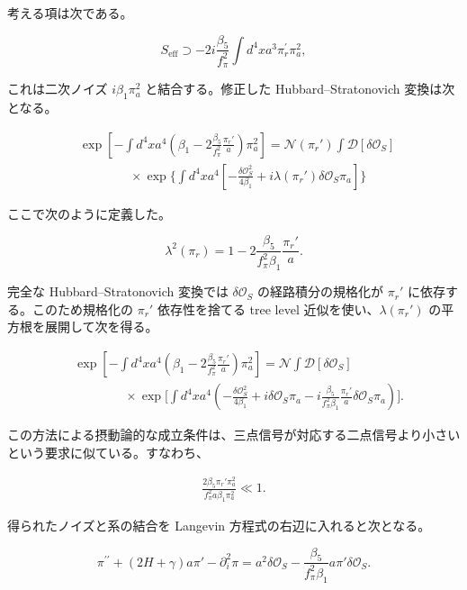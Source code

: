 \documentclass[a4paper,11pt]{ltjsarticle}
\numberwithin{equation}{section}
\def\pia{\pi_{a}}
\def\pir{\pi_{r}}
\newcommand{\Os}{\delta \mathcal{O}_{S}}
\begin{document}
考える項は次である。

\begin{equation}
S_{\text{eff}}\supset - 2i\frac{\beta_{5}}{f_\pi^2}  \int d^{4}x a^3 \pir^{\prime} \pia^2,
\end{equation}

これは二次ノイズ $i\beta_1\pia^2$ と結合する。修正した Hubbard--Stratonovich 変換は次となる。

\begin{align}
&\exp\left[-\int d^{4}x a^{4}\left(\beta_{1}-2 \frac{\beta_{5}}{f_\pi^2}  \frac{\pir'}{a}\right)\pia^{2}\right]=
\mathcal{N}(\pir')\int\mathcal{D}[\Os]\;\\
&\qquad \qquad \times \exp\Bigg\{\int d^{4}x a^{4}\left[-\frac{\Os^{2}}{4\beta_{1}}+i\lambda(\pir')\Os\pia\right]\Bigg\}\nonumber
\end{align}

ここで次のように定義した。

\begin{equation}
\lambda^{2}(\pir)=1-2\frac{\beta_{5}}{f_\pi^2 \beta_{1}} \frac{\pir'}{a}.
\end{equation}

完全な Hubbard--Stratonovich 変換では $\Os$ の経路積分の規格化が $\pir'$ に依存する。このため規格化の $\pir'$ 依存性を捨てる tree level 近似を使い、$\lambda(\pir')$ の平方根を展開して次を得る。

\begin{align}
&\exp\left[-\int d^{4}x a^{4}\left(\beta_{1}-2 \frac{\beta_{5}}{f_\pi^2}  \frac{\pir'}{a}\right)\pia^{2}\right]=\mathcal{N}\int\mathcal{D}[\Os]\; \\
& \qquad \qquad \times \exp\Bigg[\int d^{4}x a^{4} \left(-\frac{\Os^{2}}{4\beta_{1}}+i\Os\pia-i\frac{\beta_{5}}{f_\pi^2 \beta_{1}} \frac{\pir'}{a}\Os\pia\right)\Bigg].\nonumber
\end{align}

この方法による摂動論的な成立条件は、三点信号が対応する二点信号より小さいという要求に似ている。すなわち、

\begin{align}
\frac{2 \beta_{5}\pir' \pia^2}{f_{\pi}^{2} a \beta_{1} \pia^2}\ll1.
\end{align}

得られたノイズと系の結合を Langevin 方程式の右辺に入れると次となる。

\begin{equation}
\pi^{\prime \prime}+\left( 2H + \gamma\right)a\pi'-\partial_{i}^{2}\pi=a^2 \Os- \frac{\beta_{5}}{f_\pi^2 \beta_{1}} a \pi'\Os. 
\end{equation}
\end{document}

